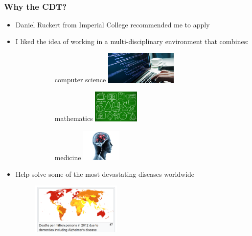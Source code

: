 \documentclass[10pt,xcolor=table]{beamer}
\begin{document}
\begin{frame}
\frametitle{Why the CDT?}

\begin{itemize}
 \item Daniel Ruckert from Imperial College recommended me to apply

 \vspace{1em}
 
 \item I liked the idea of working in a multi-disciplinary environment that combines:
 
 \begin{figure}
  \begin{subfigure}{0.29\textwidth}
  \centering 
  computer science
   \includegraphics[height=1.6cm,trim=300 0 0 0,clip]{computerScience}
  \end{subfigure}
  \begin{subfigure}{0.29\textwidth}
  \centering 
  mathematics
   \includegraphics[height=1.6cm]{mathematics.jpg}
  \end{subfigure}
  \begin{subfigure}{0.29\textwidth}
  \centering 
  medicine
   \includegraphics[height=1.6cm]{medicine.jpg}
  \end{subfigure}
 \end{figure}

 \vspace{1em}
 
 \item Help solve some of the most devastating diseases worldwide
 
 \begin{figure}
 \centering
 \includegraphics[height=2.5cm]{adPrevalence}
 
 \end{figure}

 
\end{itemize}



\end{frame}
\end{document}
